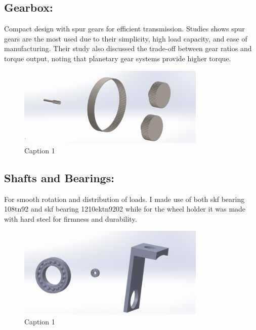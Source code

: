 \documentclass[../../main]{subfiles}
\begin{document}
\subsection{Gearbox:}
Compact design with spur gears for efficient transmission.
Studies shows spur gears are the most used due to their simplicity, high
load capacity, and ease of manufacturing. Their study also discussed the
trade-off between gear ratios and torque output, noting that planetary
gear systems provide higher torque.
\begin{figure}[h]
  \centering
  \includegraphics[width=0.8\textwidth]{sublatex/Opryrmi/media/image3.png} 
  \caption{Caption 1}
\end{figure}

\subsection{Shafts and Bearings:} 
For smooth rotation and distribution of loads.
I made use of both skf bearing 108tn92 and skf bearing 1210ektn9202
while for the wheel holder it was made with hard steel for firmness and
durability.
\begin{figure}[h]
  \centering
  \includegraphics[width=0.8\textwidth]{sublatex/Opryrmi/media/image4.png} 
  \caption{Caption 1}
\end{figure}
\end{document}
